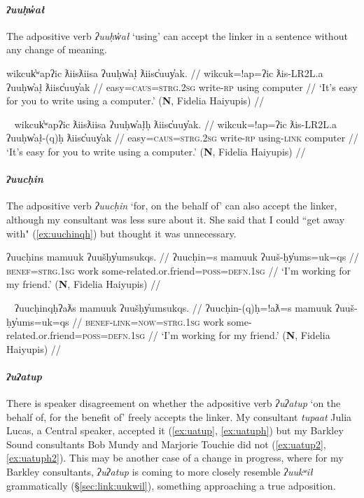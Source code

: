 \paragraph{\textit{ʔuuḥw̓ał}} \label{sec:link:uuhwal} The adpositive verb \textit{ʔuuḥw̓ał} `using' can accept the linker in a sentence without any change of meaning.

\ex \label{ex:uuhwal}
\begingl
\glpreamble wikcuk̓ʷapʔic ƛiisƛiisa ʔuuḥw̓ał̣ ƛiisc̓uuy̓ak. //
\gla wikcuk=!ap=ʔic ƛis-LR2L.a ʔuuḥw̓ał̣ ƛiisc̓uuy̓ak //
\glb easy=\textsc{caus}=\textsc{strg.2sg} write-\textsc{rp} using computer //
\glft `It's easy for you to write using a computer.' (\textbf{N}, Fidelia Haiyupis) //
\endgl
\xe

\ex~ \label{ex:uuhwalh}
\begingl
\glpreamble wikcuk̓ʷapʔic ƛiisƛiisa ʔuuḥw̓ał̣ḥ ƛiisc̓uuy̓ak. //
\gla wikcuk=!ap=ʔic ƛis-LR2L.a ʔuuḥw̓ał̣-(q)ḥ ƛiisc̓uuy̓ak //
\glb easy=\textsc{caus}=\textsc{strg.2sg} write-\textsc{rp} using-\textsc{link} computer //
\glft `It's easy for you to write using a computer.' (\textbf{N}, Fidelia Haiyupis) //
\endgl
\xe

\paragraph{\textit{ʔuucḥin}} \label{sec:link:uuchin} The adpositive verb \textit{ʔuucḥin} `for, on the behalf of' can also accept the linker, although my consultant was less sure about it. She said that I could ``get away with" (\ref{ex:uuchinqh}) but thought it was unnecessary.

\ex \label{ex:uuchin}
\begingl
\glpreamble ʔuucḥins mamuuk ʔuušḥy̓umsukqs. //
\gla ʔuucḥin=s mamuuk ʔuuš-ḥy̓ums=uk=qs //
\glb \textsc{benef}=\textsc{strg.1sg} work some-related.or.friend=\textsc{poss}=\textsc{defn.1sg} //
\glft `I'm working for my friend.' (\textbf{N}, Fidelia Haiyupis) //
\endgl
\xe

\ex~ \label{ex:uuchinqh}
\begingl
\glpreamble ʔuucḥinqḥʔaƛs mamuuk ʔuušḥy̓umsukqs. //
\gla ʔuucḥin-(q)ḥ=!aƛ=s mamuuk ʔuuš-ḥy̓ums=uk=qs //
\glb \textsc{benef}-\textsc{link}=\textsc{now}=\textsc{strg.1sg} work some-related.or.friend=\textsc{poss}=\textsc{defn.1sg} //
\glft `I'm working for my friend.' (\textbf{N}, Fidelia Haiyupis) //
\endgl
\xe

\paragraph{\textit{ʔuʔatup}} \label{sec:link:uatup} There is speaker disagreement on whether the adpositive verb \textit{ʔuʔatup} `on the behalf of, for the benefit of' freely accepts the linker. My consultant \textit{tupaat} Julia Lucas, a Central speaker, accepted it (\ref{ex:uatup}, \ref{ex:uatuph}) but my Barkley Sound consultants Bob Mundy and Marjorie Touchie did not (\ref{ex:uatup2}, \ref{ex:uatuph2}). This may be another case of a change in progress, where for my Barkley consultants, \textit{ʔuʔatup} is coming to more closely resemble \textit{ʔuukʷił} grammatically (\S\ref{sec:link:uukwil}), something approaching a true adposition.

